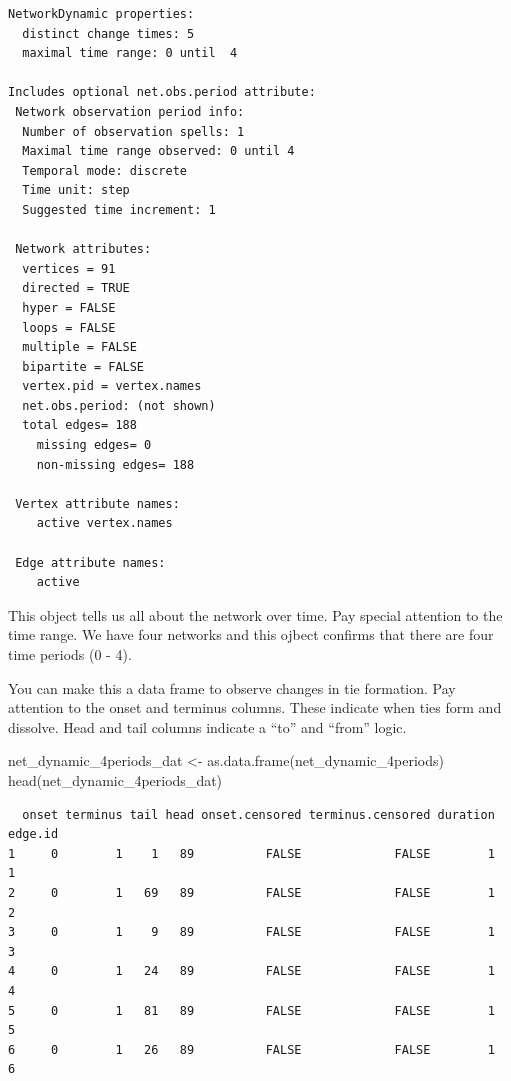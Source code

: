 \documentclass[
  letterpaper,
  DIV=11,
  numbers=noendperiod]{scrreprt}
\newenvironment{Shaded}{\begin{snugshade}}{\end{snugshade}}
\newcommand{\FunctionTok}[1]{\textcolor[rgb]{0.28,0.35,0.67}{#1}}
\newcommand{\NormalTok}[1]{\textcolor[rgb]{0.00,0.23,0.31}{#1}}
\newcommand{\OtherTok}[1]{\textcolor[rgb]{0.00,0.23,0.31}{#1}}
\begin{document}
\begin{verbatim}
NetworkDynamic properties:
  distinct change times: 5 
  maximal time range: 0 until  4 

Includes optional net.obs.period attribute:
 Network observation period info:
  Number of observation spells: 1 
  Maximal time range observed: 0 until 4 
  Temporal mode: discrete 
  Time unit: step 
  Suggested time increment: 1 

 Network attributes:
  vertices = 91 
  directed = TRUE 
  hyper = FALSE 
  loops = FALSE 
  multiple = FALSE 
  bipartite = FALSE 
  vertex.pid = vertex.names 
  net.obs.period: (not shown)
  total edges= 188 
    missing edges= 0 
    non-missing edges= 188 

 Vertex attribute names: 
    active vertex.names 

 Edge attribute names: 
    active 
\end{verbatim}

This object tells us all about the network over time. Pay special
attention to the time range. We have four networks and this ojbect
confirms that there are four time periods (0 - 4).

You can make this a data frame to observe changes in tie formation. Pay
attention to the onset and terminus columns. These indicate when ties
form and dissolve. Head and tail columns indicate a ``to'' and ``from''
logic.

\begin{Shaded}
\begin{Highlighting}[]
\NormalTok{net\_dynamic\_4periods\_dat }\OtherTok{\textless{}{-}} \FunctionTok{as.data.frame}\NormalTok{(net\_dynamic\_4periods)}
\FunctionTok{head}\NormalTok{(net\_dynamic\_4periods\_dat)}
\end{Highlighting}
\end{Shaded}

\begin{verbatim}
  onset terminus tail head onset.censored terminus.censored duration edge.id
1     0        1    1   89          FALSE             FALSE        1       1
2     0        1   69   89          FALSE             FALSE        1       2
3     0        1    9   89          FALSE             FALSE        1       3
4     0        1   24   89          FALSE             FALSE        1       4
5     0        1   81   89          FALSE             FALSE        1       5
6     0        1   26   89          FALSE             FALSE        1       6
\end{verbatim}
\end{document}
